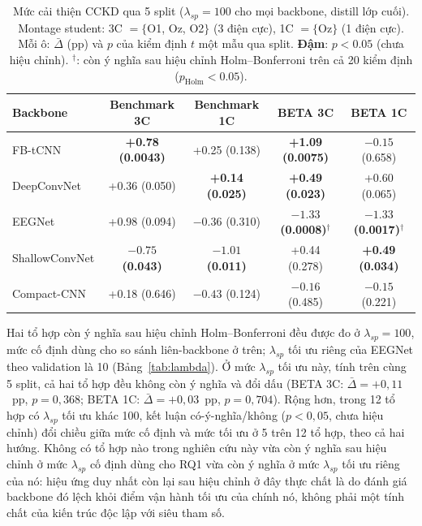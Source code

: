 \documentclass[11pt,a4paper,twoside,asymmetric]{article}
\begin{document}
\begin{table}[htbp]
\caption{Mức cải thiện CCKD qua 5 split ($\lambda_{sp}=100$ cho mọi backbone, distill lớp cuối). Montage student: 3C $=\{$O1, Oz, O2$\}$ (3 điện cực), 1C $=\{$Oz$\}$ (1 điện cực). Mỗi ô: $\bar\Delta$ (pp) và $p$ của kiểm định $t$ một mẫu qua split. \textbf{Đậm}: $p<0.05$ (chưa hiệu chỉnh). $^\dagger$: còn ý nghĩa sau hiệu chỉnh Holm--Bonferroni trên cả 20 kiểm định ($p_{\text{Holm}}<0.05$).}
\label{tab:rq1}
\begin{center}
\footnotesize
\begin{tabular}{lcccc}
\toprule
Backbone & Benchmark 3C & Benchmark 1C & BETA 3C & BETA 1C \\
\midrule
FB-tCNN & \textbf{+0.78 (0.0043)} & +0.25 (0.138) & \textbf{+1.09 (0.0075)} & $-0.15$ (0.658) \\
DeepConvNet & +0.36 (0.050) & \textbf{+0.14 (0.025)} & \textbf{+0.49 (0.023)} & +0.60 (0.065) \\
EEGNet & +0.98 (0.094) & $-0.36$ (0.310) & \textbf{$-1.33$ (0.0008)}$^\dagger$ & \textbf{$-1.33$ (0.0017)}$^\dagger$ \\
ShallowConvNet & \textbf{$-0.75$ (0.043)} & \textbf{$-1.01$ (0.011)} & +0.44 (0.278) & \textbf{+0.49 (0.034)} \\
Compact-CNN & +0.18 (0.646) & $-0.43$ (0.124) & $-0.16$ (0.485) & $-0.15$ (0.221) \\
\bottomrule
\end{tabular}
\end{center}
\end{table}

Hai tổ hợp còn ý nghĩa sau hiệu chỉnh Holm--Bonferroni đều được đo ở $\lambda_{sp}=100$, mức cố định dùng cho so sánh liên-backbone ở trên; $\lambda_{sp}$ tối ưu riêng của EEGNet theo validation là 10 (Bảng~\ref{tab:lambda}). Ở mức $\lambda_{sp}$ tối ưu này, tính trên cùng 5 split, cả hai tổ hợp đều không còn ý nghĩa và đổi dấu (BETA 3C: $\bar\Delta=+0,11$~pp, $p=0,368$; BETA 1C: $\bar\Delta=+0,03$~pp, $p=0,704$). Rộng hơn, trong 12 tổ hợp có $\lambda_{sp}$ tối ưu khác 100, kết luận có-ý-nghĩa/không ($p<0,05$, chưa hiệu chỉnh) đổi chiều giữa mức cố định và mức tối ưu ở 5 trên 12 tổ hợp, theo cả hai hướng. Không có tổ hợp nào trong nghiên cứu này vừa còn ý nghĩa sau hiệu chỉnh ở mức $\lambda_{sp}$ cố định dùng cho RQ1 vừa còn ý nghĩa ở mức $\lambda_{sp}$ tối ưu riêng của nó: hiệu ứng duy nhất còn lại sau hiệu chỉnh ở đây thực chất là do đánh giá backbone đó lệch khỏi điểm vận hành tối ưu của chính nó, không phải một tính chất của kiến trúc độc lập với siêu tham số.
\end{document}
